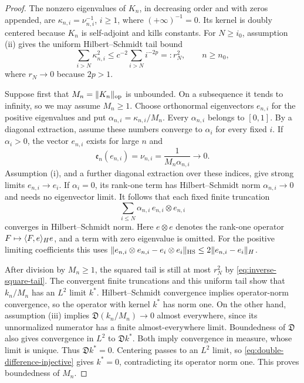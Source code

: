 \begin{proof}
The nonzero eigenvalues of \(K_n\), in decreasing order and with zeros
appended, are \(\kappa_{n,i}=\nu_{n,i}^{-1}\), \(i\ge1\), where
\((+\infty)^{-1}=0\).  Its kernel is doubly centered because \(K_n\) is
self-adjoint and kills constants.  For \(N\ge i_0\), assumption (ii) gives
the uniform Hilbert--Schmidt tail bound
\begin{equation}\label{eq:inverse-square-tail}
 \sum_{i>N}\kappa_{n,i}^2
 \le c^{-2}\sum_{i>N}i^{-2p}=:r_N^2,
 \qquad n\ge n_0,
\end{equation}
where \(r_N\to0\) because \(2p>1\).

Suppose first that \(M_n=\lVert K_n\rVert_{\mathrm{op}}\) is unbounded.  On a
subsequence it tends to infinity, so we may assume \(M_n\ge1\).  Choose
orthonormal eigenvectors \(e_{n,i}\) for the positive eigenvalues and put
\(\alpha_{n,i}=\kappa_{n,i}/M_n\).  Every \(\alpha_{n,i}\) belongs to
\([0,1]\).  By a diagonal extraction, assume these numbers converge to
\(\alpha_i\) for every fixed \(i\).  If \(\alpha_i>0\), the vector
\(e_{n,i}\) exists for large \(n\) and
\[
 \mathfrak e_n(e_{n,i})=\nu_{n,i}
 =\frac{1}{M_n\alpha_{n,i}}\longrightarrow0.
\]
Assumption (i), and a further diagonal extraction over these indices,
give strong limits \(e_{n,i}\to e_i\).  If \(\alpha_i=0\), its rank-one
term has Hilbert--Schmidt norm \(\alpha_{n,i}\to0\) and needs no eigenvector
limit.  It follows that each fixed finite truncation
\[
 \sum_{i\le N}\alpha_{n,i}\,e_{n,i}\otimes e_{n,i}
\]
converges in Hilbert--Schmidt norm.  Here \(e\otimes e\) denotes the
rank-one operator \(F\mapsto\langle F,e\rangle_H e\), and a term with zero
eigenvalue is omitted.  For the positive limiting coefficients this uses
\(\lVert e_{n,i}\otimes e_{n,i}-e_i\otimes e_i\rVert_{\mathrm{HS}}
\le2\lVert e_{n,i}-e_i\rVert_H\).

After division by \(M_n\ge1\), the squared tail is still at most \(r_N^2\)
by \eqref{eq:inverse-square-tail}.  The convergent finite truncations and
this uniform tail show that \(k_n/M_n\) has an \(L^2\) limit \(k^*\).
Hilbert--Schmidt convergence implies operator-norm convergence, so the
operator with kernel \(k^*\) has norm one.  On the other hand,
assumption (iii) implies \(\mathfrak D(k_n/M_n)\to0\) almost everywhere,
since its unnormalized numerator has a finite almost-everywhere limit.
Boundedness of \(\mathfrak D\) also gives convergence in \(L^2\) to
\(\mathfrak Dk^*\).  Both imply convergence in measure, whose limit is
unique.  Thus \(\mathfrak Dk^*=0\).  Centering passes to an \(L^2\) limit,
so \eqref{eq:double-difference-injective} gives \(k^*=0\), contradicting
its operator norm one.  This proves boundedness of \(M_n\).


\end{proof}
